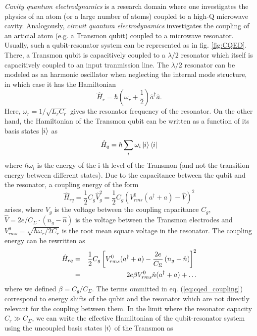{\it Cavity quantum electrodynamics} is a research domain where one investigates the physics of an atom (or a large number of atoms) coupled to a high-Q microwave cavity. Analogously, {\it circuit quantum electrodynamics} investigates the coupling of an articial atom (e.g. a Transmon qubit) coupled to a microwave resonator. Usually, such a qubit-resonator system can be represented as in fig. \ref{fig:CQED}. There, a Transmon qubit is capacitively coupled to a $\lambda/2$ resonator which itself is capacitively coupled to an input tranmission line. The $\lambda/2$ resonator can be modeled as an harmonic oscillator when neglecting the internal mode structure, in which case it has the Hamiltonian
%
\begin{equation}
\hat{H}_r = \hbar(\omega_r+\frac{1}{2})\hat{a}^\dagger\hat{a}.
\end{equation}
%
Here, $\omega_r = 1/\sqrt{L_r C_r}$ gives the resonator frequency of the resonator. On the other hand, the Hamiltonian of the Transmon qubit can be written as a function of its basis states $\left| i \right>$ as
%
\begin{equation}
\hat{H}_{q} = \hbar\sum\limits_i \omega_i \left| i \right>\left< i \right|
\end{equation}
%
where $\hbar\omega_i$ is the energy of the i-th level of the Transmon (and not the transition energy between different states). Due to the capacitance between the qubit and the resonator, a coupling energy of the form
%
\begin{equation}
\hat{H}_{rq} = \frac{1}{2}C_{g}\hat{V}_g^2 = \frac{1}{2}C_g\left(V^0_{rms}(a^\dagger+a)-\hat{V}\right)^2
\end{equation}
%
arises, where $V_g$ is the voltage between the coupling capacitance $C_g$, $\hat{V}=2e/C_\Sigma \cdot(n_g-\hat{n})$ is the voltage between the Transmon electrodes and $V^0_{rms} = \sqrt{\hbar \omega_r/2C_r}$ is the root mean square voltage in the resonator. The coupling energy can be rewritten as
%
\begin{eqnarray}
\hat{H}_{rq} & = & \frac{1}{2}C_g\left[V_{rms}^0(a^\dagger+a)-\frac{2e}{C_\Sigma}\left(n_g-\hat{n}\right)\right]^2 \notag \\
       & = & 2e \beta V_{rms}^0\hat{n}(a^\dagger+a) + \hdots \label{eq:cqed_coupling}
\end{eqnarray}
%
where we defined $\beta = C_g/C_\Sigma$. The terms ommitted in eq. (\ref{eq:cqed_coupling}) correspond to energy shifts of the qubit and the resonator which are not directly relevant for the coupling between them. 
 In the limit where the resonator capacity $C_r \gg C_\Sigma$, we can write the effective Hamiltonian of the qubit-resonator system using the uncoupled basis states $\left| i \right>$ of the Transmon as
